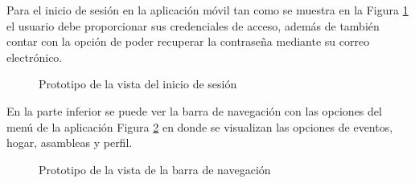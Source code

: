 Para el inicio de sesión en la aplicación móvil tan como se muestra en la Figura \ref{fig:login-movil} el usuario debe proporcionar sus credenciales de acceso, además de también contar con la opción de poder recuperar la contraseña mediante su correo electrónico.

\begin{figure}[H]
    \centering
    \caption{Prototipo de la vista del inicio de sesión}
    \label{fig:login-movil}
\end{figure}

En la parte inferior se puede ver la barra de navegación con las opciones del menú de la aplicación Figura \ref{fig:navegacion-movil} en donde se visualizan las opciones de eventos, hogar, asambleas y perfil.

\begin{figure}[H]
    \centering
    \caption{Prototipo de la vista de la barra de navegación}
    \label{fig:navegacion-movil}
\end{figure}

